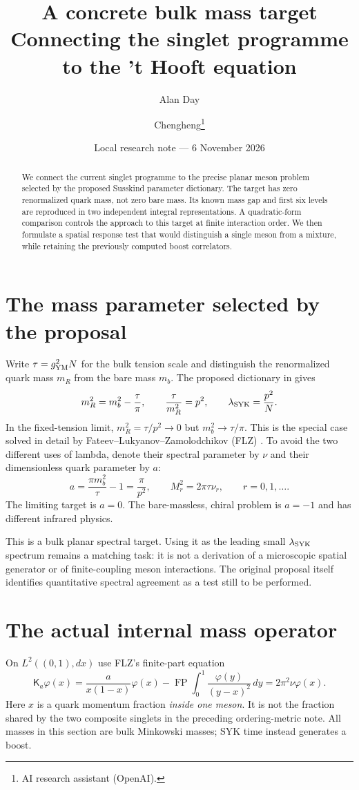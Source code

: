 \documentclass[11pt,a4paper]{article}
\title{A concrete bulk mass target\\Connecting the singlet programme to the 't Hooft equation}
\author{Alan Day \and Chengheng\thanks{AI research assistant (OpenAI).}}
\date{Local research note --- 6 November 2026}
\newcommand{\Kop}{\mathsf K}
\begin{document}
\maketitle
\begin{abstract}
We connect the current singlet programme to the precise planar meson
problem selected by the proposed Susskind parameter dictionary. The
target has zero renormalized quark mass, not zero bare mass. Its known
mass gap and first six levels are reproduced in two independent integral
representations. A quadratic-form comparison controls the approach to
this target at finite interaction order. We then formulate a spatial
response test that would distinguish a single meson from a mixture,
while retaining the previously computed boost correlators.
\end{abstract}
\section{The mass parameter selected by the proposal}
Write $\tau=g_{\rm YM}^2N$ for the bulk tension scale and distinguish
the renormalized quark mass $m_R$ from the bare mass $m_b$.
The proposed dictionary in \cite{MSS26,MSS25} gives
\begin{equation}
 m_R^2=m_b^2-\frac{\tau}{\pi},\qquad
 \frac{\tau}{m_R^2}=p^2,\qquad
 \lambda_{\rm SYK}=\frac{p^2}{N}.
\end{equation}
In the fixed-tension limit, $m_R^2=\tau/p^2\to0$ but
$m_b^2\to\tau/\pi$. This is the special case solved in detail by
Fateev--Lukyanov--Zamolodchikov (FLZ) \cite{FLZ}.
To avoid the two different uses of lambda, denote their spectral
parameter by $\nu$ and their dimensionless quark parameter by $a$:
\begin{equation}
 a=\frac{\pi m_b^2}{\tau}-1=\frac{\pi}{p^2},\qquad
 M_r^2=2\pi\tau\nu_r,\qquad r=0,1,\ldots.
\end{equation}
The limiting target is $a=0$. The bare-massless, chiral problem is
$a=-1$ and has different infrared physics.

This is a bulk planar spectral target. Using it as the leading small
$\lambda_{\rm SYK}$ spectrum remains a matching task: it is not a
derivation of a microscopic spatial generator or of finite-coupling
meson interactions. The original proposal itself identifies quantitative
spectral agreement as a test still to be performed.

\newpage
\section{The actual internal mass operator}
On $L^2((0,1),dx)$ use FLZ's finite-part equation
\begin{equation}
 \Kop_a\varphi(x)=\frac{a}{x(1-x)}\varphi(x)
 -\operatorname{FP}\!\int_0^1\frac{\varphi(y)}{(y-x)^2}\,dy
 =2\pi^2\nu\varphi(x).\label{eq:thooft}
\end{equation}
Here $x$ is a quark momentum fraction \emph{inside one meson}.
It is not the fraction shared by the two composite singlets in the
preceding ordering-metric note. All masses in this section are bulk
Minkowski masses; SYK time instead generates a boost.
\end{document}
